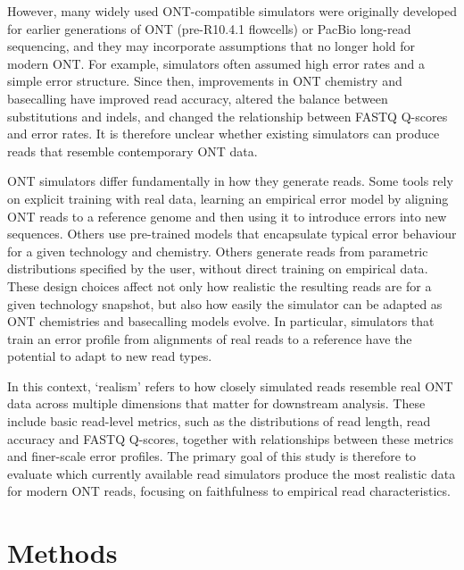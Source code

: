 \documentclass[webpdf,modern,large]{biorxiv}
\begin{document}
However, many widely used ONT-compatible simulators were originally developed for earlier generations of ONT (pre-R10.4.1 flowcells) or PacBio long-read sequencing, and they may incorporate assumptions that no longer hold for modern ONT\cite{yang2017nanosim, ono2022pbsim3, wick2019badread, lau2016longislnd, stocker2016simlord}. For example, simulators often assumed high error rates and a simple error structure\cite{yang2017nanosim, wick2019badread}. Since then, improvements in ONT chemistry and basecalling have improved read accuracy, altered the balance between substitutions and indels, and changed the relationship between FASTQ Q-scores and error rates\cite{sereika2022oxford}. It is therefore unclear whether existing simulators can produce reads that resemble contemporary ONT data.

ONT simulators differ fundamentally in how they generate reads. Some tools rely on explicit training with real data, learning an empirical error model by aligning ONT reads to a reference genome and then using it to introduce errors into new sequences\cite{lau2016longislnd, ono2022pbsim3, yang2017nanosim}. Others use pre-trained models that encapsulate typical error behaviour for a given technology and chemistry. Others generate reads from parametric distributions specified by the user, without direct training on empirical data\cite{wick2019badread, stocker2016simlord}. These design choices affect not only how realistic the resulting reads are for a given technology snapshot, but also how easily the simulator can be adapted as ONT chemistries and basecalling models evolve. In particular, simulators that train an error profile from alignments of real reads to a reference have the potential to adapt to new read types.

In this context, `realism' refers to how closely simulated reads resemble real ONT data across multiple dimensions that matter for downstream analysis. These include basic read-level metrics, such as the distributions of read length, read accuracy and FASTQ Q-scores, together with relationships between these metrics and finer-scale error profiles. The primary goal of this study is therefore to evaluate which currently available read simulators produce the most realistic data for modern ONT reads, focusing on faithfulness to empirical read characteristics.




\section{Methods}
\end{document}
